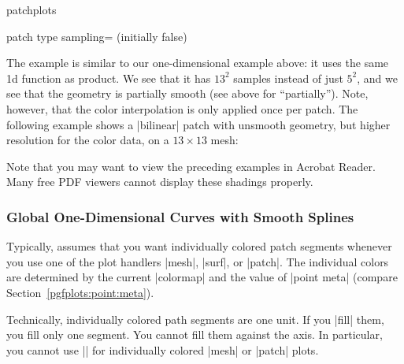 {\begin{pgfplotslibrary}{patchplots}
\begin{pgfplotskey}{patch type sampling= (initially false)}
\begin{codeexample}[]
\end{codeexample}
    The example is similar to our one-dimensional example above: it uses the
    same 1d function as product. We see that it has $13^2$ samples instead of
    just $5^2$, and we see that the geometry is partially smooth (see above for
    ``partially''). Note, however, that the color interpolation is only applied
    once per patch. The following example shows a |bilinear| patch with
    unsmooth geometry, but higher resolution for the color data, on a
    $13\times13$ mesh:
\begin{codeexample}[]
\end{codeexample}
    Note that you may want to view the preceding examples in Acrobat Reader.
    Many free PDF viewers cannot display these shadings properly.
\end{pgfplotskey}


\subsubsection{Global One-Dimensional Curves with Smooth Splines}

Typically, \PGFPlots{} assumes that you want individually colored patch
segments whenever you use one of the plot handlers |mesh|, |surf|, or |patch|.
The individual colors are determined by the current |colormap| and the value of
|point meta| (compare Section~\ref{pgfplots:point:meta}).

Technically, individually colored path segments are one unit. If you |fill|
them, you fill only one segment. You cannot fill them against the axis. In
particular, you cannot use |\closedcycle| for individually colored |mesh| or
|patch| plots.


\end{pgfplotslibrary}}
